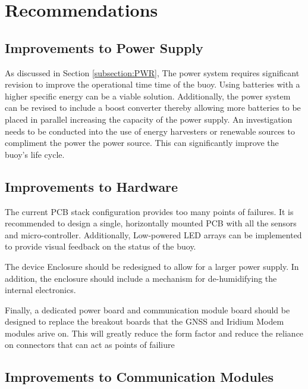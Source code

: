 
\chapter{Recommendations}
\label{ch:recommendations}
\section{Improvements to Power Supply}

As discussed in Section \ref{subsection:PWR}, The power system requires significant revision to improve the operational time time of the buoy. Using batteries with a higher specific energy can be a viable solution. Additionally, the power system can be revised to include a boost converter thereby allowing more batteries to be placed in parallel increasing the capacity of the power supply. An investigation needs to be conducted into the use of energy harvesters or renewable sources to compliment the power the power source. This can significantly improve the buoy's life cycle.

\section{Improvements to Hardware}

The current PCB stack configuration provides too many points of failures. It is recommended to design a single, horizontally mounted PCB with all the sensors and micro-controller. Additionally, Low-powered LED arrays can be implemented to provide visual feedback on the status of the buoy.\par 

The device Enclosure should be redesigned to allow for a larger power supply. In addition, the enclosure should include a mechanism for de-humidifying the internal electronics. 

Finally, a dedicated power board and communication module board should be designed to replace the breakout boards that the GNSS and Iridium Modem modules arive on. This will greatly reduce the form factor and reduce the reliance on connectors that can act as points of failiure
\section{Improvements to Communication Modules}

